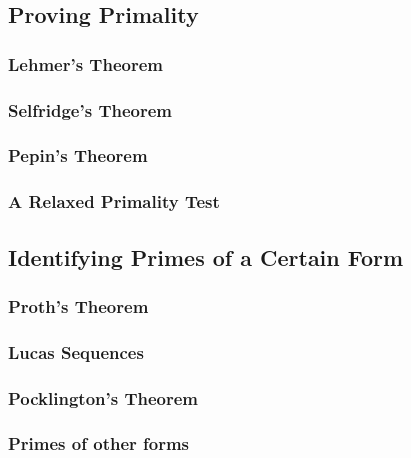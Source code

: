 \documentclass{article}
\begin{document}







\subsection{Proving Primality}

\subsubsection{Lehmer's Theorem}

\subsubsection{Selfridge's Theorem}

\subsubsection{Pepin's Theorem}

\subsubsection{A Relaxed Primality Test}

\subsection{Identifying Primes of a Certain Form}

\subsubsection{Proth's Theorem}

\subsubsection{Lucas Sequences}

\subsubsection{Pocklington's Theorem}

\subsubsection{Primes of other forms}
\end{document}
